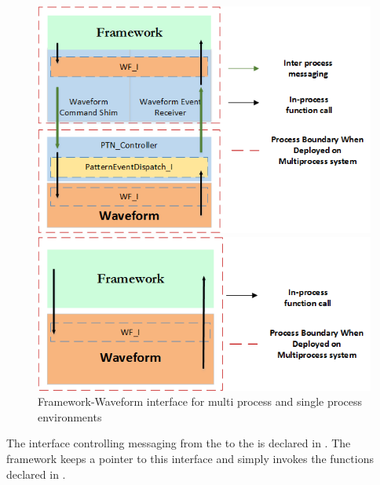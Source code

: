\begin{figure}[ht]
\centering
	  \begin{minipage}[b]{0.4\textwidth}
	    \includegraphics[width=\textwidth]{figures/Framework_Waveform_ShimArchitectureMP}
	  \end{minipage}
	  \hspace{5mm}
	  \begin{minipage}[b]{0.4\textwidth}
	    \includegraphics[width=\textwidth]{figures/Framework_Waveform_ShimArchitectureSP}
	  \end{minipage}
\caption{Framework-Waveform interface for multi process and single process environments}
\label{fig:FrameworkWFInterface}
\end{figure}


\iffalse 
The interface controlling messaging from the  to the  is declared in . The framework keeps a pointer to this interface and simply invokes the functions declared in .

